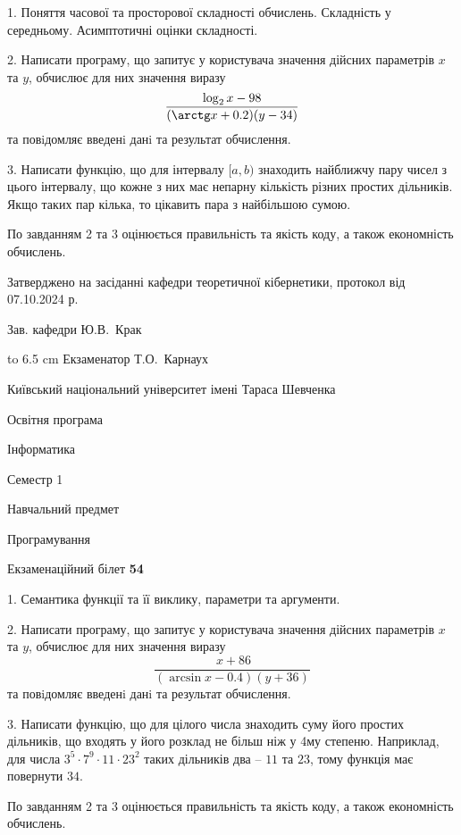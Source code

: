 \documentclass[12pt, ukrainian]{article}
\begin{document}
{%
1. Поняття часової та просторової складності обчислень. Складність у середньому. Асимптотичні оцінки складності.%
\par
2. Написати програму, що запитує у користувача значення дійсних параметрів $x$ та $y$, обчислює для них значення виразу 
$$\frac{\log_{2} x - 98}{(\arctg x + 0.2) (y - 34)}$$ 
та повiдомляє введенi данi та результат обчислення.

\par
3. Написати функцію, що для інтервалу $[a, b)$ знаходить найближчу пару чисел з цього інтервалу, що кожне з них має непарну кількість різних простих дільників. Якщо таких пар кілька, то цікавить пара з найбільшою сумою.

По завданням 2 та 3 оцінюється правильність та якість коду, а також економність обчислень.

}
{\smallskip\smallskip \begin {scriptsize} Затверджено на засіданні кафедри теоретичної кібернетики, протокол   від   07.10.2024 р.\par\smallskip\smallskip\smallskip\smallskip
{\parbox {6.5 cm} {Зав. кафедри \dotfill Ю.В.~Крак}}\hspace {0.7cm} {\hbox to 6.5 cm { Екзаменатор \dotfill Т.О.~Карнаух}} \end{scriptsize}}
\vspace{0.9cm}
{{\begin {scriptsize}\par
{ \center  Київський національний університет імені Тараса Шевченка \par}
{\parbox {5 cm}{Освітня програма \hfill}{\parbox {7 cm}{Інформатика\hfill}}\parbox {6 cm}{\hfill Семестр 1}}\par
{\parbox {5 cm} {Навчальний предмет \hfill}\parbox {7 cm}{Програмування \hfill}\parbox {6cm}{\hfill}\par}\vspace{-15pt} \end{scriptsize}}{\center Екзаменаційний білет \No \textbf { 54 }\par}}
{%
1. Семантика функції та її виклику, параметри та аргументи.%
\par
2. Написати програму, що запитує у користувача значення дійсних параметрів $x$ та $y$, обчислює для них значення виразу 
$$\frac{\ x + 86}{(\arcsin x - 0.4) (y + 36)}$$ 
та повiдомляє введенi данi та результат обчислення.

\par
3. Написати функцію, що для цілого числа знаходить суму його простих дільників, що входять у його розклад не більш ніж у 4му степеню. Наприклад, для числа $3^5{\cdot}7^9{\cdot}11{\cdot}23^{2}$ таких дільників два – $11$ та $23$, тому функція має повернути $34$.

По завданням 2 та 3 оцінюється правильність та якість коду, а також економність обчислень.

}
\end{document}
